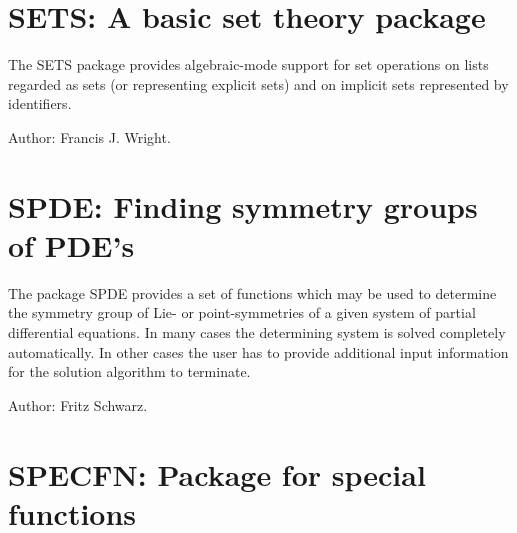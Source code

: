 \newpage

\section{SETS: A basic set theory package} 

The SETS package provides algebraic-mode support for set operations on
lists regarded as sets (or representing explicit sets) and on implicit
sets represented by identifiers.

Author: Francis J. Wright.


\newpage

\section{SPDE: Finding symmetry groups of {PDE}'s}

The package SPDE provides a set of functions which may be used to
determine the symmetry group of Lie- or point-symmetries of a given system
of partial differential equations. In many cases the determining system is
solved completely automatically. In other cases the user has to provide
additional input information for the solution algorithm to terminate.

Author: Fritz Schwarz.


\newpage

\section{SPECFN: Package for special functions} 

